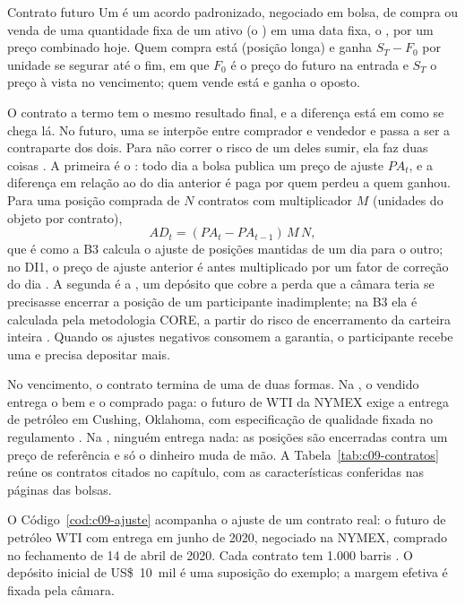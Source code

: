 \begin{definicao}{Contrato futuro}
Um  é um acordo padronizado, negociado em bolsa, de compra ou venda de uma quantidade fixa de um ativo (o ) em uma data fixa, o , por um preço combinado hoje. Quem compra está  (posição longa) e ganha $S_T - F_0$ por unidade se segurar até o fim, em que $F_0$ é o preço do futuro na entrada e $S_T$ o preço à vista no vencimento; quem vende está  e ganha o oposto.
\end{definicao}

O contrato a termo tem o mesmo resultado final, e a diferença está em como se chega lá. No futuro, uma  se interpõe entre comprador e vendedor e passa a ser a contraparte dos dois. Para não correr o risco de um deles sumir, ela faz duas coisas \citep[cap.~2]{hull2022}. A primeira é o : todo dia a bolsa publica um preço de ajuste $PA_t$, e a diferença em relação ao do dia anterior é paga por quem perdeu a quem ganhou. Para uma posição comprada de $N$ contratos com multiplicador $M$ (unidades do objeto por contrato),
\begin{equation}
  AD_t = (PA_t - PA_{t-1})\, M\, N ,
  \label{eq:c09-ajuste}
\end{equation}
que é como a B3 calcula o ajuste de posições mantidas de um dia para o outro; no DI1, o preço de ajuste anterior é antes multiplicado por um fator de correção do dia \citep{b3ditreino}. A segunda é a , um depósito que cobre a perda que a câmara teria se precisasse encerrar a posição de um participante inadimplente; na B3 ela é calculada pela metodologia CORE, a partir do risco de encerramento da carteira inteira \citep{b3core}. Quando os ajustes negativos consomem a garantia, o participante recebe uma  e precisa depositar mais.

No vencimento, o contrato termina de uma de duas formas. Na , o vendido entrega o bem e o comprado paga: o futuro de WTI da NYMEX exige a entrega de petróleo em Cushing, Oklahoma, com especificação de qualidade fixada no regulamento \citep{cmecl}. Na , ninguém entrega nada: as posições são encerradas contra um preço de referência e só o dinheiro muda de mão. A Tabela~\ref{tab:c09-contratos} reúne os contratos citados no capítulo, com as características conferidas nas páginas das bolsas.

O Código~\ref{cod:c09-ajuste} acompanha o ajuste de um contrato real: o futuro de petróleo WTI com entrega em junho de 2020, negociado na NYMEX, comprado no fechamento de 14 de abril de 2020. Cada contrato tem 1.000 barris \citep{cmecl}. O depósito inicial de US\$~10~mil é uma suposição do exemplo; a margem efetiva é fixada pela câmara.

